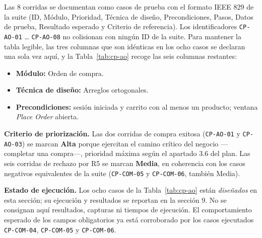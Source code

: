 Las 8 corridas se documentan como casos de prueba con el formato IEEE 829 de la suite
(ID, Módulo, Prioridad, Técnica de diseño, Precondiciones, Pasos, Datos de prueba,
Resultado esperado y Criterio de referencia). Los identificadores \texttt{CP-AO-01}
\dots{} \texttt{CP-AO-08} no colisionan con ningún ID de la suite. Para mantener la
tabla legible, las tres columnas que son idénticas en los ocho casos se declaran una
sola vez aquí, y la Tabla~\ref{tab:cp-ao} recoge las seis columnas restantes:

\begin{itemize}
  \item \textbf{Módulo:} Orden de compra.
  \item \textbf{Técnica de diseño:} Arreglos ortogonales.
  \item \textbf{Precondiciones:} sesión iniciada y carrito con al menos un producto;
        ventana \emph{Place Order} abierta.
\end{itemize}

\textbf{Criterio de priorización.} Las dos corridas de compra exitosa
(\texttt{CP-AO-01} y \texttt{CP-AO-03}) se marcan \textbf{Alta} porque ejercitan el
camino crítico del negocio —completar una compra—, prioridad máxima según el apartado
3.6 del plan. Las seis corridas de rechazo por R5 se marcan \textbf{Media}, en
coherencia con los casos negativos equivalentes de la suite (\texttt{CP-COM-05} y
\texttt{CP-COM-06}, también Media).

\medskip
\noindent\textbf{Estado de ejecución.} Los ocho casos de la Tabla~\ref{tab:cp-ao} están
\emph{diseñados} en esta sección; su ejecución y resultados se reportan en la
sección 9. No se consignan aquí resultados, capturas ni tiempos de ejecución. El
comportamiento esperado de los campos obligatorios ya está corroborado por los casos
ejecutados \texttt{CP-COM-04}, \texttt{CP-COM-05} y \texttt{CP-COM-06}.

